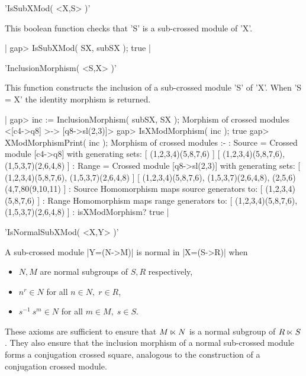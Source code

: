 %

'IsSubXMod( <X,S> )'

This boolean function checks that 'S' is a sub-crossed module of 'X'.

|    gap> IsSubXMod( SX, subSX );
    true  |

%

'InclusionMorphism( <S,X> )'

This function constructs the inclusion of a  sub-crossed module 'S' of
'X'.  When 'S = X' the identity morphism is returned.

|    gap> inc := InclusionMorphism( subSX, SX );
    Morphism of crossed modules <[c4->q8] >-> [q8->sl(2,3)]>
    gap> IsXModMorphism( inc );
    true
    gap> XModMorphismPrint( inc );
    Morphism of crossed modules :- 
    : Source = Crossed module [c4->q8] with generating sets:
      [ (1,2,3,4)(5,8,7,6) ]
      [ (1,2,3,4)(5,8,7,6), (1,5,3,7)(2,6,4,8) ]
    :  Range = Crossed module [q8->sl(2,3)] with generating sets:
      [ (1,2,3,4)(5,8,7,6), (1,5,3,7)(2,6,4,8) ]
      [ (1,2,3,4)(5,8,7,6), (1,5,3,7)(2,6,4,8), (2,5,6)(4,7,80(9,10,11) ]
    : Source Homomorphism maps source generators to:
      [ (1,2,3,4)(5,8,7,6) ]
    : Range Homomorphism maps range generators to:
      [ (1,2,3,4)(5,8,7,6), (1,5,3,7)(2,6,4,8) ] 
    :  isXModMorphism? true                            |

%

'IsNormalSubXMod( <X,Y> )'

A sub-crossed module |Y=(N->M)| is normal in |X=(S->R)| when
\begin{itemize}
\item {$N,M$ are normal subgroups of $S,R$ respectively,}
\item {$n^r \in N$ for all $n \in N, \; r \in R$,}
\item {$s^{-1}\ s^m \in N$ for all $m \in M, \; s \in S$.}
\end{itemize}

These axioms  are  sufficient to  ensure that $M   \semidirect N$ is a
normal subgroup of  $R \semidirect S$.   %
They also  ensure that the  inclusion morphism of a normal sub-crossed
module forms  a     conjugation  crossed square,  analogous   to   the
construction of a conjugation crossed module.

